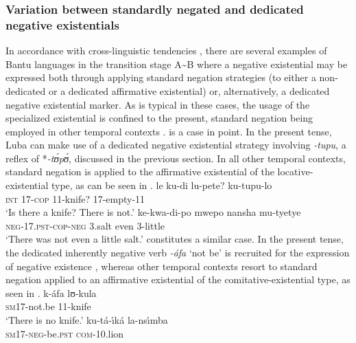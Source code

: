 \documentclass[output=paper]{langsci/langscibook}
\begin{document}
\subsubsection{Variation between standardly negated and dedicated negative
existentials}\label{sec:1:5.2.2} In accordance with cross-linguistic
tendencies \citep{Veselinova2016}, there are several examples of Bantu
languages in the transition stage A{\textasciitilde}B where a negative
existential may be expressed both through applying standard negation
strategies (to either a non-dedicated or a dedicated affirmative
existential) or, alternatively, a dedicated negative existential marker. As
is typical in these cases, the usage of the specialized existential is
confined to the present, standard negation being employed in other temporal
contexts \parencites{Veselinova2013}{Veselinova2016}.  is a case in
point. In the present tense, Luba can make use of a dedicated negative
existential strategy involving \textit{-tupu}, a reflex of
*\textit{-t{\'ʊ}p{\'ʊ}}, discussed in the previous section. In all other
temporal contexts, standard negation is applied to the affirmative
existential of the locative-existential type, as can be seen in
.  \ea\label{ex:luba-knife-salt}
 \ea\gll le ku-di
lu-pete? ku-tupu-lo\\ \textsc{int} 17-\textsc{cop} 11-knife? 17-empty-11\\
\glt 	`Is there a knife? There is not.' \ex\gll ke-kwa-di-po mwepo nansha
mu-tyetye\\ \textsc{neg-17.pst-cop-neg} 3.salt even 3-little\\ \glt
`There was not even a little salt.' \z\z {} constitutes a similar
case. In the present tense, the dedicated inherently negative verb
\textit{-{\'a}fa} `not be' is recruited for the expression of negative
existence , whereas other temporal contexts resort to
standard negation applied to an affirmative existential of the
comitative-existential type, as seen in .
\ea\label{ex:ombo-knife-lion}  \ea\label{ex:ombo-knife} \gll k-{\'a}fa
lʊ-kula\\ \textsc{sm}17-not.be 11-knife\\ \glt 	`There is no knife.'
\ex\label{ex:ombo-lion} \gll ku-t{\'a}-{\'\i}k{\'a} la-ns{\'\i}mba\\
\textsc{sm}17-\textsc{neg}-be.\textsc{pst} \textsc{com}-10.lion\\ \glt
\end{document}
